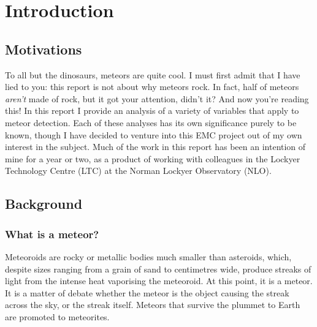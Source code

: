 \chapter{Introduction}
\label{chap:intro}
\section{Motivations}
To all but the dinosaurs, meteors are quite cool. I must first admit that I have lied to you: this report is not about why meteors rock. In fact, half of meteors {\it aren't} made of rock, but it got your attention, didn't it? And now you're reading this! In this report I provide an analysis of a variety of variables that apply to meteor detection. Each of these analyses has its own significance purely to be known, though I have decided to venture into this EMC project out of my own interest in the subject. Much of the work in this report has been an intention of mine for a year or two, as a product of working with colleagues in the Lockyer Technology Centre (LTC) at the Norman Lockyer Observatory (NLO).
\section{Background}
\subsection{What is a meteor?}
Meteoroids are rocky or metallic bodies much smaller than asteroids, which, despite sizes ranging from a grain of sand to centimetres wide, produce streaks of light from the intense heat vaporising the meteoroid. At this point, it is a meteor. It is a matter of debate whether the meteor is the object causing the streak across the sky, or the streak itself. Meteors that survive the plummet to Earth are promoted to meteorites. \\
